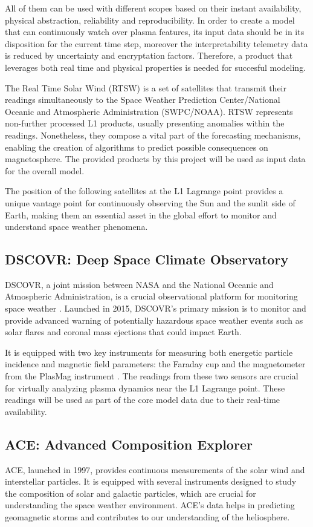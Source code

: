 \documentclass{article}
\begin{document}
All of them can be used with different scopes based on their instant availability, physical abstraction, reliability and reproducibility. In order to create a model that can continuously watch over plasma features, its input data should be in its disposition for the current time step, moreover the interpretability telemetry data is reduced by uncertainty and encryptation factors. Therefore, a product that leverages both real time and physical properties is needed for succesful modeling.

The Real Time Solar Wind (RTSW) is a set of satellites that transmit their readings simultaneously to the Space Weather Prediction Center/National Oceanic and Atmospheric Administration (SWPC/NOAA). RTSW represents non-further processed L1 products, usually presenting anomalies within the readings. Nonetheless, they compose a vital part of the forecasting mechanisms, enabling the creation of algorithms to predict possible consequences on magnetosphere. The provided products by this project will be used as input data for the overall model.

The position of the following satellites at the L1 Lagrange point provides a unique vantage point for continuously observing the Sun and the sunlit side of Earth, making them an essential asset in the global effort to monitor and understand space weather phenomena.

\subsection{DSCOVR: Deep Space Climate Observatory}
DSCOVR, a joint mission between NASA and the National Oceanic and Atmospheric Administration, is a crucial observational platform for monitoring space weather \cite{nasa_dscovr}. Launched in 2015, DSCOVR's primary mission is to monitor and provide advanced warning of potentially hazardous space weather events such as solar flares and coronal mass ejections that could impact Earth.

It is equipped with two key instruments for measuring both energetic particle incidence and magnetic field parameters: the Faraday cup and the magnetometer from the PlasMag instrument \cite{nasa_dscovr}. The readings from these two sensors are crucial for virtually analyzing plasma dynamics near the L1 Lagrange point. These readings will be used as part of the core model data due to their real-time availability.

\subsection{ACE: Advanced Composition Explorer}
ACE, launched in 1997, provides continuous measurements of the solar wind and interstellar particles. It is equipped with several instruments designed to study the composition of solar and galactic particles, which are crucial for understanding the space weather environment. ACE's data helps in predicting geomagnetic storms and contributes to our understanding of the heliosphere.
\end{document}
